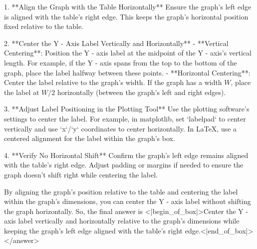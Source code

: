 1. **Align the Graph with the Table Horizontally**  
   Ensure the graph’s left edge is aligned with the table’s right edge. This keeps the graph’s horizontal position fixed relative to the table.  

2. **Center the Y - Axis Label Vertically and Horizontally**  
   - **Vertical Centering**: Position the Y - axis label at the midpoint of the Y - axis’s vertical length. For example, if the Y - axis spans from the top to the bottom of the graph, place the label halfway between these points.  
   - **Horizontal Centering**: Center the label relative to the graph’s width. If the graph has a width \( W \), place the label at \( W/2 \) horizontally (between the graph’s left and right edges).  

3. **Adjust Label Positioning in the Plotting Tool**  
   Use the plotting software’s settings to center the label. For example, in matplotlib, set `labelpad` to center vertically and use `x`/`y` coordinates to center horizontally. In LaTeX, use a centered alignment for the label within the graph’s box.  

4. **Verify No Horizontal Shift**  
   Confirm the graph’s left edge remains aligned with the table’s right edge. Adjust padding or margins if needed to ensure the graph doesn’t shift right while centering the label.  


By aligning the graph’s position relative to the table and centering the label within the graph’s dimensions, you can center the Y - axis label without shifting the graph horizontally.  
So, the final answer is <|begin_of_box|>Center the Y - axis label vertically and horizontally relative to the graph’s dimensions while keeping the graph’s left edge aligned with the table’s right edge.<|end_of_box|></answer>